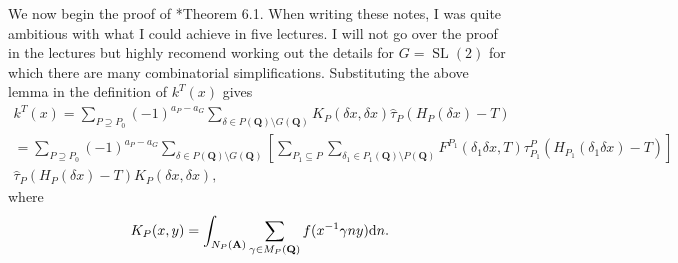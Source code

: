 \documentclass[11pt]{amsart}
\def\apg{a_{P} - a_{G}}
\def\A{\mathbf A}
\def\Q{\mathbf Q}
\def\d{\text d}
\def\bs{\setminus} 			%
\def\sl{\operatorname{SL}}
\theoremstyle{remark}
\begin{document}
We now begin the proof of \cite{clay}*{Theorem 6.1}. When writing these notes, I was quite ambitious with what I could achieve in five lectures. I will not go over the proof in the lectures but highly recomend working out the details for $G = \sl(2)$ for which there are many combinatorial simplifications. Substituting the above lemma in the definition of $k^T(x)$ gives
\begin{multline*}
	k^T(x) 	 = \sum_{P \supseteq P_0} (-1)^{\apg} \sum_{\delta \in P(\Q)\bs G(\Q)} K_P(\delta x, \delta x) 
				\hat\tau_P(H_P(\delta x) - T) \\
			 = \sum_{P \supseteq P_0} (-1)^{\apg} \sum_{\delta \in P(\Q)\bs G(\Q)} \left[
				\sum_{P_1 \subseteq P} \sum_{\delta_1 \in P_1(\Q) \bs P(\Q)} F^{P_1}(\delta_1 \delta x, T)
				\tau_{P_1}^P(H_{P_1}(\delta_1 \delta x) - T) \right] \\
			 	\hat\tau_P(H_P(\delta x) - T) 
				K_P(\delta x, \delta x),
\end{multline*}
where
\[ K_P(x, y) = \int_{N_P(\A)} \sum_{\gamma \in M_P(\Q)} f(x^{-1} \gamma n y) \d n. \]
\end{document}
